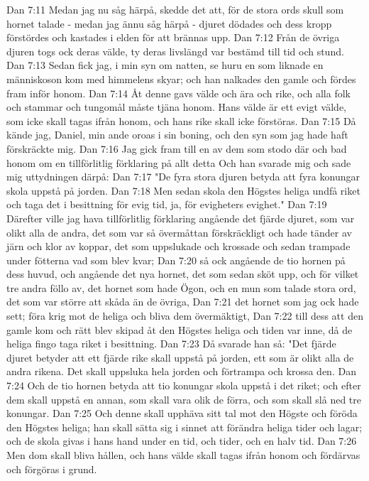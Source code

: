 Dan 7:11  Medan jag nu såg härpå, skedde det att, för de stora ords skull som hornet talade - medan jag ännu såg härpå - djuret dödades och dess kropp förstördes och kastades i elden för att brännas upp.
Dan 7:12  Från de övriga djuren togs ock deras välde, ty deras livslängd var bestämd till tid och stund.
Dan 7:13  Sedan fick jag, i min syn om natten, se huru en som liknade en människoson kom med himmelens skyar; och han nalkades den gamle och fördes fram inför honom.
Dan 7:14  Åt denne gavs välde och ära och rike, och alla folk och stammar och tungomål måste tjäna honom. Hans välde är ett evigt välde, som icke skall tagas ifrån honom, och hans rike skall icke förstöras.
Dan 7:15  Då kände jag, Daniel, min ande oroas i sin boning, och den syn som jag hade haft förskräckte mig.
Dan 7:16  Jag gick fram till en av dem som stodo där och bad honom om en tillförlitlig förklaring på allt detta Och han svarade mig och sade mig uttydningen därpå:
Dan 7:17  "De fyra stora djuren betyda att fyra konungar skola uppstå på jorden.
Dan 7:18  Men sedan skola den Högstes heliga undfå riket och taga det i besittning för evig tid, ja, för evigheters evighet."
Dan 7:19  Därefter ville jag hava tillförlitlig förklaring angående det fjärde djuret, som var olikt alla de andra, det som var så övermåttan förskräckligt och hade tänder av järn och klor av koppar, det som uppslukade och krossade och sedan trampade under fötterna vad som blev kvar;
Dan 7:20  så ock angående de tio hornen på dess huvud, och angående det nya hornet, det som sedan sköt upp, och för vilket tre andra föllo av, det hornet som hade Ögon, och en mun som talade stora ord, det som var större att skåda än de övriga,
Dan 7:21  det hornet som jag ock hade sett; föra krig mot de heliga och bliva dem övermäktigt,
Dan 7:22  till dess att den gamle kom och rätt blev skipad åt den Högstes heliga och tiden var inne, då de heliga fingo taga riket i besittning.
Dan 7:23  Då svarade han så: "Det fjärde djuret betyder att ett fjärde rike skall uppstå på jorden, ett som är olikt alla de andra rikena. Det skall uppsluka hela jorden och förtrampa och krossa den.
Dan 7:24  Och de tio hornen betyda att tio konungar skola uppstå i det riket; och efter dem skall uppstå en annan, som skall vara olik de förra, och som skall slå ned tre konungar.
Dan 7:25  Och denne skall upphäva sitt tal mot den Högste och föröda den Högstes heliga; han skall sätta sig i sinnet att förändra heliga tider och lagar; och de skola givas i hans hand under en tid, och tider, och en halv tid.
Dan 7:26  Men dom skall bliva hållen, och hans välde skall tagas ifrån honom och fördärvas och förgöras i grund.
